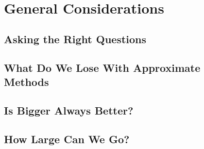 \chapter{General Considerations}

\section{Asking the Right Questions}

\section{What Do We Lose With Approximate Methods}

\section{Is Bigger Always Better?}

\section{How Large Can We Go?}



